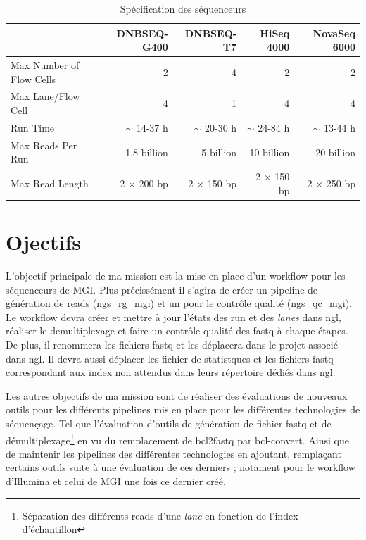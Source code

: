 \begin{table}[H]
\begin{tabular}{ |p{5cm}||r|r|r|r| }
    \hline
    & \footnotesize{DNBSEQ-G400} & \footnotesize{DNBSEQ-T7} & \footnotesize{HiSeq 4000} & \footnotesize{NovaSeq 6000} \\\hline\hline
    Max Number of Flow Cells & 2 & 4 & 2 & 2 \\\hline
    Max Lane/Flow Cell & 4 & 1 & 4 & 4 \\\hline
    Run Time & $\sim$ 14-37 h & $\sim$ 20-30 h & $\sim$ 24-84 h & $\sim$ 13-44 h \\\hline
    Max Reads Per Run & 1.8 billion & 5 billion & 10 billion & 20 billion \\\hline
    Max Read Length & 2 $\times$ 200 bp & 2 $\times$ 150 bp & 2 $\times$ 150 bp & 2 $\times$ 250 bp \\\hline
\end{tabular}
    \caption{Spécification des séquenceurs}
    \label{spe-seq}
\end{table}

\section{Ojectifs}
L'objectif principale de ma mission est la mise en place d'un workflow pour les séquenceurs de MGI. Plus précissément il s'agira de créer un pipeline de génération de reads (ngs\_rg\_mgi) et un pour le contrôle qualité (ngs\_qc\_mgi). Le workflow devra créer et mettre à jour l'états des run et des \emph{lanes} dans ngl, réaliser le demultiplexage et faire un contrôle qualité des fastq à chaque étapes. De plus, il renommera les fichiers fastq et les déplacera dans le projet associé dans ngl. Il devra aussi déplacer les fichier de statistques et les fichiers fastq correspondant aux index non attendus dans leurs répertoire dédiés dans ngl.

Les autres objectifs de ma mission sont de réaliser des évaluations de nouveaux outils pour les différents pipelines mis en place pour les différentes technologies de séquençage. Tel que l'évaluation d'outils de génération de fichier fastq et de démultiplexage\footnote{Séparation des différents reads d'une \emph{lane} en fonction de l'index d'échantillon} en vu du remplacement de bcl2fastq par bcl-convert.
Ainsi que de maintenir les pipelines des différentes technologies en ajoutant, remplaçant certains outils suite à une évaluation de ces derniers ; notament pour le workflow d'Illumina et celui de MGI une fois ce dernier créé.


